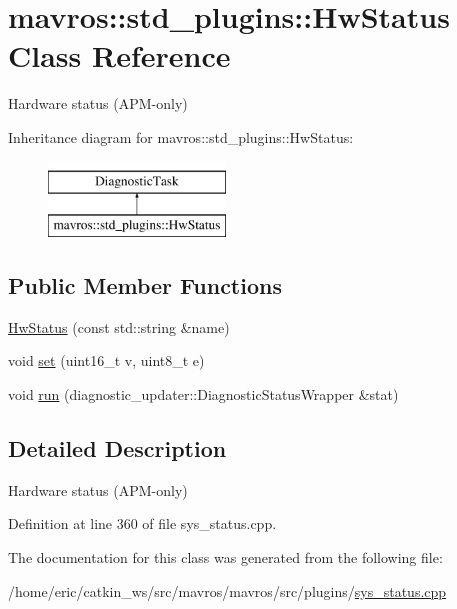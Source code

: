 \hypertarget{classmavros_1_1std__plugins_1_1HwStatus}{}\section{mavros\+::std\+\_\+plugins\+::Hw\+Status Class Reference}
\label{classmavros_1_1std__plugins_1_1HwStatus}


Hardware status (A\+P\+M-\/only)  


Inheritance diagram for mavros\+::std\+\_\+plugins\+::Hw\+Status\+:\begin{figure}[H]
\begin{center}
\leavevmode
\includegraphics[height=2.000000cm]{classmavros_1_1std__plugins_1_1HwStatus}
\end{center}
\end{figure}
\subsection*{Public Member Functions}
\begin{DoxyCompactItemize}
\item 
\mbox{\hyperlink{group__plugin_ga11b96d7caa88529a91eb7955a253d331}{Hw\+Status}} (const std\+::string \&name)
\item 
void \mbox{\hyperlink{group__plugin_ga8d117525ad76f5d494bf0ec2874d9fa2}{set}} (uint16\+\_\+t v, uint8\+\_\+t e)
\item 
void \mbox{\hyperlink{group__plugin_gaa8ece83db94ffbadf4bcf7a5e5e501a4}{run}} (diagnostic\+\_\+updater\+::\+Diagnostic\+Status\+Wrapper \&stat)
\end{DoxyCompactItemize}


\subsection{Detailed Description}
Hardware status (A\+P\+M-\/only) 

Definition at line 360 of file sys\+\_\+status.\+cpp.



The documentation for this class was generated from the following file\+:\begin{DoxyCompactItemize}
\item 
/home/eric/catkin\+\_\+ws/src/mavros/mavros/src/plugins/\mbox{\hyperlink{sys__status_8cpp}{sys\+\_\+status.\+cpp}}\end{DoxyCompactItemize}
